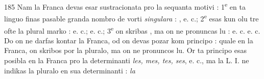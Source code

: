 \begin{VUpage}[189]{185}
Nam la Franca devas esar sustracionata pro la sequanta\nl
motivi : 1\textsuperscript{e}  en ta linguo finas pasable granda nombro de\nl
vorti \textit{singulara} : \nl
{}\nl
{}, e. c.; 2\textsuperscript{e}  esas kun olu tre ofte la plural\cc
marko : \nl
{} e. c.; \nl
{}\nl
{} e. c.; 3\textsuperscript{e} on skribas , ma on ne pronuncas lu : \nl
{}\nl
e. c. e. c. Do on ne darfas kontar la Franca, od on devas\nl
pozar kom principo : quale en la Franca, on skribos  por\nl
la pluralo, ma on ne pronuncos lu. Or ta principo esas\nl
posibla en la Franca pro la determinanti \textit{les, mes, tes, ses}, e. c.,\nl
ma la L. I. ne indikas la pluralo en sua determinanti : \textit{la}\nl
\end{VUpage}

